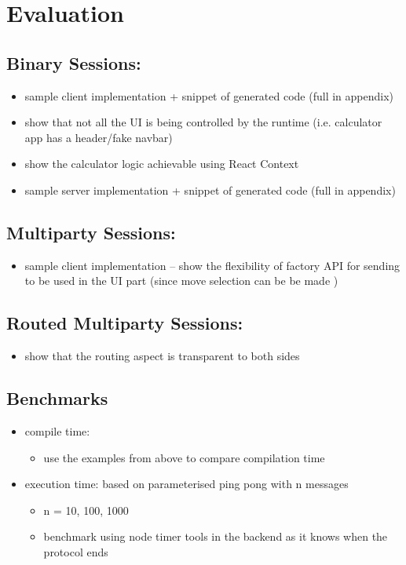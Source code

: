 \chapter{Evaluation}
\label{chap:eval}

\section{Binary Sessions: }
\begin{itemize}
\item sample client implementation + snippet of generated code (full in appendix)
\item show that not all the UI is being controlled by the runtime (i.e. calculator app has a header/fake navbar)
\item show the calculator logic achievable using React Context
\item sample server implementation + snippet of generated code (full in appendix)
\end{itemize}

\section{Multiparty Sessions: }
\begin{itemize}
\item sample client implementation -- show the flexibility of factory API for sending to be used in the UI part (since move selection can be be made )
\end{itemize}

\section{Routed Multiparty Sessions: }
\begin{itemize}
\item show that the routing aspect is transparent to both sides
\end{itemize}

\section{Benchmarks}
\begin{itemize}
\item compile time: \begin{itemize}
\item use the examples from above to compare compilation time
\end{itemize}
\item execution time: based on parameterised ping pong with n messages
\begin{itemize}
\item n = 10, 100, 1000
\item benchmark using node timer tools in the backend as it knows when the protocol ends
\end{itemize}
\end{itemize}